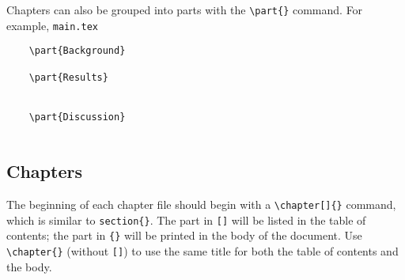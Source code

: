 Chapters can also be grouped into parts with the \verb+\part{}+ command.
For example,
\texttt{main.tex}
\begin{verbatim}
    \part{Background}
    
    \part{Results}
    
    
    \part{Discussion}
    
\end{verbatim}
%

\subsection{Chapters} %

The beginning of each chapter file should begin with a \verb+\chapter[]{}+
%
command, which is similar to \verb"section{}".
The part in \verb"[]" will be listed in the table of contents; the part in \verb"{}" will be printed in the body of the document.
Use \verb+\chapter{}+ (without \verb"[]") to use the same title for both the table of contents and the body.

